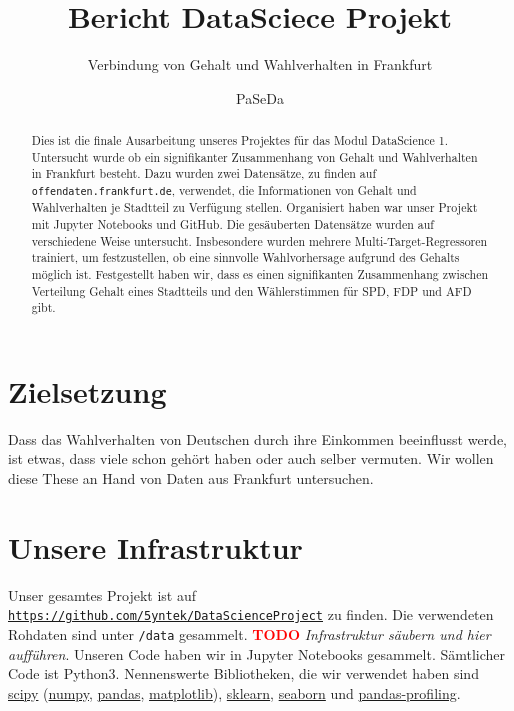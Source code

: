 \documentclass[a4paper,10pt]{scrartcl}
\title{\vspace{-2cm}Bericht DataSciece Projekt}
\subtitle{Verbindung von Gehalt und Wahlverhalten in Frankfurt}
\author{PaSeDa}
\date{}
\newcommand{\TODO}{\textcolor{red}{\textbf{TODO }}}
\begin{document}
\maketitle

\begin{abstract}Dies ist die finale Ausarbeitung unseres Projektes für das Modul DataScience 1. Untersucht wurde ob ein signifikanter Zusammenhang von Gehalt und Wahlverhalten in Frankfurt besteht. Dazu wurden zwei Datensätze, zu finden auf \lstinline|offendaten.frankfurt.de|, verwendet, die Informationen von Gehalt und Wahlverhalten je Stadtteil zu Verfügung stellen. Organisiert haben war unser Projekt mit Jupyter Notebooks und GitHub. Die gesäuberten Datensätze wurden auf verschiedene Weise untersucht. Insbesondere wurden mehrere Multi-Target-Regressoren trainiert, um festzustellen, ob eine sinnvolle Wahlvorhersage aufgrund des Gehalts möglich ist. Festgestellt haben wir, dass es einen signifikanten Zusammenhang zwischen Verteilung Gehalt eines Stadtteils und den Wählerstimmen für SPD, FDP und AFD gibt.  \end{abstract}

\tableofcontents

\section{Zielsetzung}
Dass das Wahlverhalten von Deutschen durch ihre Einkommen beeinflusst werde, ist etwas, dass viele schon gehört haben oder auch selber vermuten. Wir wollen diese These an Hand von Daten aus Frankfurt untersuchen.

\section{Unsere Infrastruktur}
Unser gesamtes Projekt ist auf \href{Github}{\lstinline|https://github.com/5yntek/DataScienceProject|} zu finden. Die verwendeten Rohdaten sind unter \lstinline|/data| gesammelt. \TODO \emph{Infrastruktur säubern und hier aufführen}. Unseren Code haben wir in Jupyter Notebooks gesammelt. Sämtlicher Code ist Python3. Nennenswerte Bibliotheken, die wir verwendet haben sind \href{https://www.scipy.org/}{scipy} (\href{https://numpy.org/}{numpy}, \href{https://pandas.pydata.org/}{pandas}, \href{https://matplotlib.org/}{matplotlib}), \href{https://scikit-learn.org/}{sklearn}, \href{https://seaborn.pydata.org/}{seaborn}  und \href{https://github.com/pandas-profiling/pandas-profiling}{pandas-profiling}.
\end{document}
